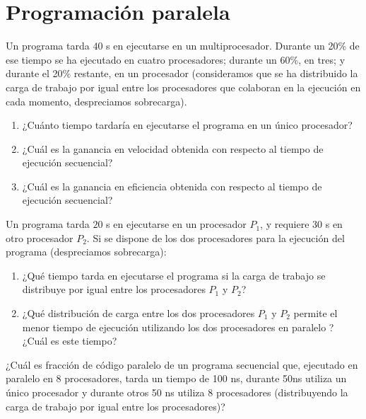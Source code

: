 \section{Programación paralela}

\begin{ejercicio}
    Un programa tarda $40$ s en ejecutarse en un multiprocesador. Durante un 20\% de ese tiempo se
    ha ejecutado en cuatro procesadores; durante un 60\%, en tres; y durante el 20\% restante, en un procesador
    (consideramos que se ha distribuido la carga de trabajo por igual entre los procesadores que colaboran en la
    ejecución en cada momento, despreciamos sobrecarga).
    \begin{enumerate}
        \item ¿Cuánto tiempo tardaría en ejecutarse el programa
        en un único procesador?
        \item ¿Cuál es la ganancia en velocidad obtenida con respecto al tiempo de ejecución
        secuencial?
        \item ¿Cuál es la ganancia en eficiencia obtenida con respecto al tiempo de ejecución
        secuencial?
    \end{enumerate}
\end{ejercicio}

\begin{ejercicio}
    Un programa tarda $20$ s en ejecutarse en un procesador $P_1$, y requiere $30$ s en otro procesador
    $P_2$. Si se dispone de los dos procesadores para la ejecución del programa (despreciamos sobrecarga):
    \begin{enumerate}
        \item ¿Qué tiempo tarda en ejecutarse el programa si la carga de trabajo se distribuye por igual entre los
        procesadores $P_1$ y $P_2$?
        \item ¿Qué distribución de carga entre los dos procesadores $P_1$ y $P_2$ permite el menor tiempo de
        ejecución utilizando los dos procesadores en paralelo ? ¿Cuál es este tiempo?
    \end{enumerate}
\end{ejercicio}

\begin{ejercicio}
    ¿Cuál es fracción de código paralelo de un programa secuencial que, ejecutado en paralelo en 8
    procesadores, tarda un tiempo de 100 ns, durante 50ns utiliza un único procesador y durante otros 50 ns
    utiliza 8 procesadores (distribuyendo la carga de trabajo por igual entre los procesadores)?
\end{ejercicio}

